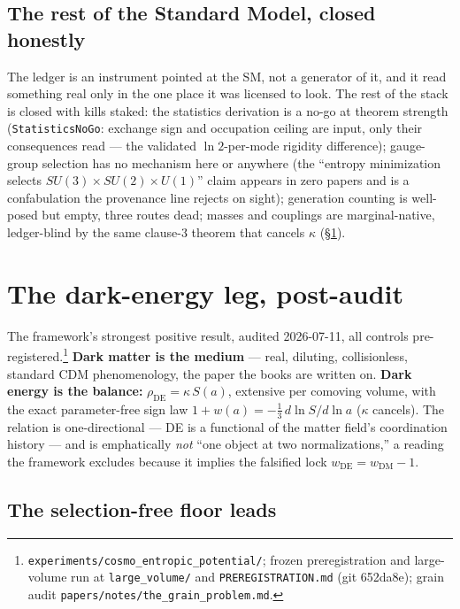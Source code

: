 \documentclass[11pt,a4paper]{article}
\begin{document}
\subsection*{The rest of the Standard Model, closed honestly}

The ledger is an instrument pointed at the SM, not a generator of it, and it read something real only in the one place it was licensed to look. The rest of the stack is closed with kills staked: the statistics derivation is a no-go at theorem strength (\texttt{StatisticsNoGo}: exchange sign and occupation ceiling are input, only their consequences read --- the validated $\ln 2$-per-mode rigidity difference); gauge-group selection has no mechanism here or anywhere (the ``entropy minimization selects $SU(3)\times SU(2)\times U(1)$'' claim appears in zero papers and is a confabulation the provenance line rejects on sight); generation counting is well-posed but empty, three routes dead; masses and couplings are marginal-native, ledger-blind by the same clause-3 theorem that cancels $\kappa$ (\S\ref{sec:dark-energy}).

\section{The dark-energy leg, post-audit}\label{sec:dark-energy}

The framework's strongest positive result, audited 2026-07-11, all controls pre-registered.\footnote{\texttt{experiments/cosmo\_entropic\_potential/}; frozen preregistration and large-volume run at \texttt{large\_volume/} and \texttt{PREREGISTRATION.md} (git 652da8e); grain audit \texttt{papers/notes/the\_grain\_problem.md}.} \textbf{Dark matter is the medium} --- real, diluting, collisionless, standard CDM phenomenology, the paper the books are written on. \textbf{Dark energy is the balance:} $\rho_{\text{DE}} = \kappa\,S(a)$, extensive per comoving volume, with the exact parameter-free sign law $1 + w(a) = -\tfrac13\,d\ln S/d\ln a$ ($\kappa$ cancels). The relation is one-directional --- DE is a functional of the matter field's coordination history --- and is emphatically \emph{not} ``one object at two normalizations,'' a reading the framework excludes because it implies the falsified lock $w_{\text{DE}} = w_{\text{DM}} - 1$.

\subsection*{The selection-free floor leads}
\end{document}
